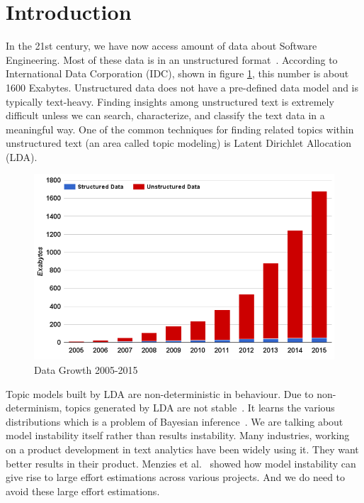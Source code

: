 \documentclass[conference]{IEEEtran}
\theoremstyle{break}
\begin{document}
\IEEEpeerreviewmaketitle


\section{Introduction}
\label{sect: intro}
In the 21st century, we have now access amount of data about Software Engineering. Most of these data is in an unstructured format~\cite{nadkarni2014structured}. According to International Data Corporation (IDC), shown in figure \ref{fig: data}, this number is about 1600 Exabytes. Unstructured data does not have a pre-defined data model and is typically text-heavy. Finding insights among unstructured text is extremely difficult unless we can search, characterize, and classify the text data in a meaningful way. One of the common techniques for finding related topics within unstructured text (an area called topic modeling) is Latent Dirichlet Allocation (LDA).

\begin{figure}[!htbp]
  \captionsetup{justification=centering}
  \includegraphics[width=\linewidth]{./fig/data.png}
  \caption{Data Growth 2005-2015}
  \label{fig: data}
\end{figure}

Topic models built by LDA are non-deterministic in behaviour. Due to non-determinism, topics generated by LDA are not stable~\cite{oliveto2010equivalence, barua2014developers}. It learns the various distributions which is a problem of Bayesian inference~\cite{blei2003latent}. We are talking about model instability itself rather than results instability. Many industries, working on a product development in text analytics have been widely using it. They want better results in their product. Menzies et al.~\cite{menzieslocal} showed how model instability can give rise to large effort estimations across various projects. And we do need to avoid these large effort estimations.
\end{document}
